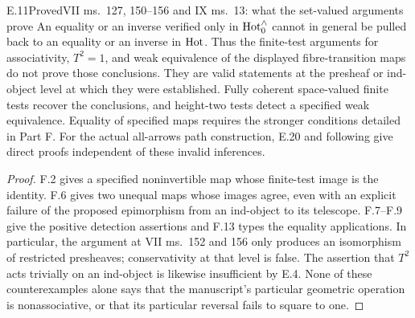 \begin{claim}{E.11}{Proved}{VII ms.~127, 150--156 and IX ms.~13: what the set-valued arguments prove}
An equality or an inverse verified only in $\mathrm{Hot}_0^{\wedge}$ cannot in general be pulled back to an equality or an inverse in $\mathrm{Hot}$. Thus the finite-test arguments for associativity, $T^2=1$, and weak equivalence of the displayed fibre-transition maps do not prove those conclusions. They are valid statements at the presheaf or ind-object level at which they were established. Fully coherent space-valued finite tests recover the conclusions, and height-two tests detect a specified weak equivalence. Equality of specified maps requires the stronger conditions detailed in Part F. For the actual all-arrows path construction, E.20 and following give direct proofs independent of these invalid inferences.
\end{claim}
\begin{proof}
F.2 gives a specified noninvertible map whose finite-test image is the identity. F.6 gives two unequal maps whose images agree, even with an explicit failure of the proposed epimorphism from an ind-object to its telescope. F.7--F.9 give the positive detection assertions and F.13 types the equality applications. In particular, the argument at VII ms.~152 and 156 only produces an isomorphism of restricted presheaves; conservativity at that level is false. The assertion that $T^2$ acts trivially on an ind-object is likewise insufficient by E.4. None of these counterexamples alone says that the manuscript's particular geometric operation is nonassociative, or that its particular reversal fails to square to one.
\end{proof}

